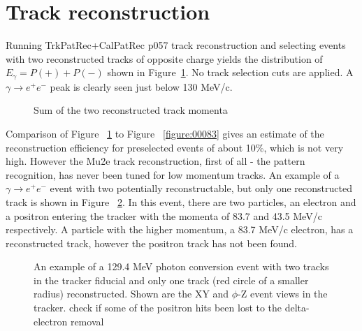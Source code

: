 %
\section{Track reconstruction}
\label{section:track_reconstruction}

Running TrkPatRec+CalPatRec p057 track reconstruction and selecting events
with two reconstructed tracks of opposite charge yields the distribution of $E_\gamma = P(+)+P(-)$
shown in Figure~\ref{figure:00084_rpc04b0s54_t2_1_smom_0}.
No track selection cuts are applied.
A $\gamma \to e^+e^-$ peak  is clearly seen just below 130 MeV/c.

\begin{figure}[H]
  \caption{
    \label{figure:00084_rpc04b0s54_t2_1_smom_0}
    Sum of the two reconstructed track momenta
  }
\end{figure}

Comparison of Figure ~\ref{figure:00084_rpc04b0s54_t2_1_smom_0} 
to Figure ~\ref{figure:00083} gives an estimate of the reconstruction efficiency
for preselected events of about 10\%, which is not very high.
%
However the Mu2e track reconstruction, first of all - the pattern recognition,
has never been tuned for low momentum tracks. An example of a $\gamma \to e^+e^-$
event with two potentially reconstructable, but only one reconstructed track
is shown in Figure ~\ref{figure:event_display}. In this event, there are two particles,
an electron and a positron entering the tracker with the momenta of 83.7 and 43.5 MeV/c
respectively. A particle with the higher momentum, a 83.7 MeV/c electron, has a reconstructed track,
however the positron track has not been found.  

\begin{figure}[H]
  \caption{
    \label{figure:event_display}
    An example of a 129.4 MeV photon conversion event with two tracks
    in the tracker fiducial and only one track (red circle of a smaller radius)
    reconstructed. Shown are the XY and $\phi$-Z event views in the tracker.
    {\red check if some of the positron hits been lost to the delta-electron removal}
  }
\end{figure}

